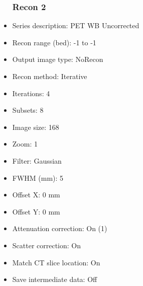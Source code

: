 \documentclass[12pt]{article}
\begin{document}
\begin{itemize}[noitemsep]
\subsubsection{Recon 2}
\item Series description: PET WB Uncorrected
\item Recon range (bed): -1 to -1
\item Output image type: NoRecon
\item Recon method: Iterative
\item Iterations: 4
\item Subsets: 8
\item Image size: 168
\item Zoom: 1
\item Filter: Gaussian
\item FWHM (mm): 5
\item Offset X: 0 mm
\item Offset Y: 0 mm
\item Attenuation correction: On (1)
\item Scatter correction: On
\item Match CT slice location: On
\item Save intermediate data: Off
\end{itemize}
\end{document}
